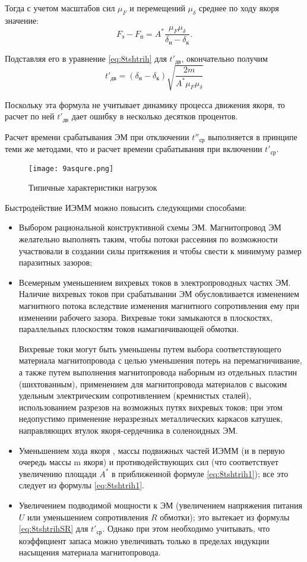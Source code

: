 Тогда с учетом масштабов сил $ \mu_F $ и перемещений $ \mu_\delta $ среднее по ходу якоря значение: 
\[ F_\text{э} - F_\text{п} = A^* \dfrac{\mu_F \mu_\delta}{\delta_\text{н} - \delta_\text{к}}. \]

Подставляя его в уравнение \eqref{eq:8tshtrih} для $ t'_\text{дв} $, окончательно получим
\begin{equation}
\label{eq:8tshtrih1}
t'_\text{дв} = (\delta_\text{н} - \delta_\text{к}) \sqrt{\dfrac{2m}{A^*\mu_F\mu_\delta}}
\end{equation}

Поскольку эта формула не учитывает динамику процесса движения якоря, то расчет по ней $ t'_\text{дв} $ дает ошибку в несколько десятков процентов.

Расчет времени срабатывания ЭМ при отключении $ t''_\text{ср} $ выполняется в принципе теми же методами, что и расчет времени срабатывания при включении $ t'_\text{ср} $.

\begin{figure}[h!]
	\caption{ Типичные характеристики нагрузок }
	\texttt{[image: 9asqure.png]}
	\label{pic:9asqure}
\end{figure}

Быстродействие ИЭММ можно повысить следующими способами:
\begin{itemize}
\item Выбором рациональной конструктивной схемы ЭМ. Магнитопровод ЭМ желательно выполнять таким, чтобы потоки рассеяния по возможности участвовали в создании силы притяжения и чтобы свести к минимуму размер паразитных зазоров;
\item Всемерным уменьшением вихревых токов в электропроводных частях ЭМ. Наличие вихревых токов при срабатывании ЭМ обусловливается изменением магнитного потока вследствие изменения магнитного сопротивления ему при изменении рабочего зазора. Вихревые токи замыкаются в плоскостях, параллельных плоскостям токов намагничивающей обмотки. 

Вихревые токи могут быть уменьшены путем выбора соответствующего материала магнитопровода с целью уменьшения потерь на перемагничивание, а также путем  выполнения магнитопровода наборным из отдельных пластин (шихтованным), применением для магнитопровода материалов с высоким удельным электрическим сопротивлением (кремнистых сталей), использованием разрезов на возможных путях вихревых токов; при этом недопустимо применение неразрезных металлических каркасов катушек, направляющих втулок якоря-сердечника в соленоидных ЭМ.
\item Уменьшением хода якоря  , массы подвижных частей ИЭММ (и в первую очередь массы m якоря) и противодействующих сил (что соответствует увеличению площади $ A^* $ в приближенной формуле \eqref{eq:8tshtrih1}); все это следует из формулы \eqref{eq:8tshtrih1}.
\item Увеличением подводимой мощности к ЭМ (увеличением напряжения питания $ U $ или уменьшением сопротивления $ R $ обмотки); это вытекает из формулы \eqref{eq:8tshtrihSR} для $ t'_\text{ср} $. Однако при этом необходимо учитывать, что коэффициент запаса можно увеличивать только в пределах индукции насыщения материала магнитопровода.
\end{itemize}

